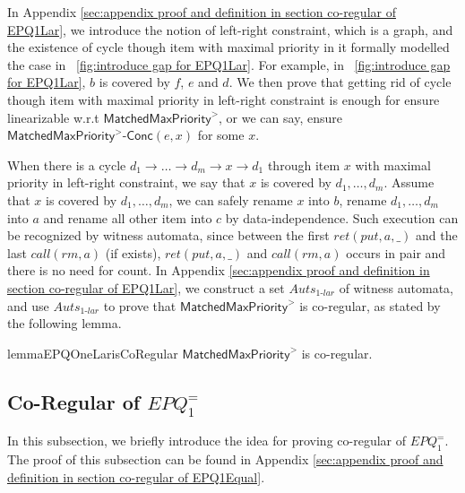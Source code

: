 In Appendix \ref{sec:appendix proof and definition in section co-regular of EPQ1Lar}, we introduce the notion of left-right constraint, which is a graph, and the existence of cycle though item with maximal priority in it formally modelled the case in \figurename~\ref{fig:introduce gap for EPQ1Lar}. For example, in \figurename~\ref{fig:introduce gap for EPQ1Lar}, $b$ is covered by $f$, $e$ and $d$. We then prove that getting rid of cycle though item with maximal priority in left-right constraint is enough for ensure linearizable w.r.t $\mathsf{MatchedMaxPriority}^{>}$, or we can say, ensure $\mathsf{MatchedMaxPriority}^{>}\mathsf{\text{-}Conc}(e,x)$ for some $x$. 

When there is a cycle $d_1 \rightarrow \ldots \rightarrow d_m \rightarrow x \rightarrow d_1$ through item $x$ with maximal priority in left-right constraint, we say that $x$ is covered by $d_1,\ldots,d_m$. Assume that $x$ is covered by $d_1,\ldots,d_m$, we can safely rename $x$ into $b$, rename $d_1,\ldots,d_m$ into $a$ and rename all other item into $c$ by data-independence. Such execution can be recognized by witness automata, since between the first $\textit{ret}(\textit{put},a,\_)$ and the last $\textit{call}(\textit{rm},a)$ (if exists), $\textit{ret}(\textit{put},a,\_)$ and $\textit{call}(\textit{rm},a)$ occurs in pair and there is no need for count. In Appendix \ref{sec:appendix proof and definition in section co-regular of EPQ1Lar}, we construct a set $\textit{Auts}_{\textit{1-lar}}$ of witness automata, and use $\textit{Auts}_{\textit{1-lar}}$ to prove that $\mathsf{MatchedMaxPriority}^{>}$ is co-regular, as stated by the following lemma.

\begin{restatable}{lemma}{EPQOneLarisCoRegular}
\label{lemma:EPQ1Lar is co-regular}
$\mathsf{MatchedMaxPriority}^{>}$ is co-regular.
\end{restatable}




\subsection{Co-Regular of $\textit{EPQ}_1^{=}$}
\label{subsec:co-regular of EPQ1Equal}

In this subsection, we briefly introduce the idea for proving co-regular of $\textit{EPQ}_1^{=}$. The proof of this subsection can be found in Appendix \ref{sec:appendix proof and definition in section co-regular of EPQ1Equal}.

